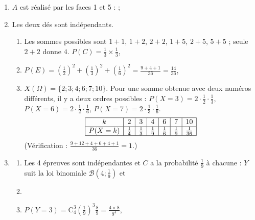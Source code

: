 \begin{enumerate}
   \item {}
      $A$ est r\'ealis\'e par les faces 1 et 5 :  ; 
   \item Les deux d\'es sont ind\'ependants.
      \begin{enumerate}
         \item {}
            Les sommes possibles sont $1+1$, $1+2$, $2+2$, $1+5$, $2+5$, $5+5$ ; seule $2 + 2$ donne $4$.
            $P(C) = \frac{1}{3}\times\frac{1}{3}$, 
         \item {}
            $P(E) = \left(\frac{1}{2}\right)^2 + \left(\frac{1}{3}\right)^2 + \left(\frac{1}{6}\right)^2 = \frac{9 + 4 + 1}{36} = \frac{14}{36}$,
            \par\noindent{}
         \item {}
            $X(\Omega) = \{2 ; 3 ; 4 ; 6 ; 7 ; 10\}$. Pour une somme obtenue avec deux num\'eros diff\'erents, il y a deux ordres possibles :
            $P(X = 3) = 2\cdot\frac{1}{2}\cdot\frac{1}{3}$, $P(X = 6) = 2\cdot\frac{1}{2}\cdot\frac{1}{6}$, $P(X = 7) = 2\cdot\frac{1}{3}\cdot\frac{1}{6}$.
            \[
               \begin{array}{|c|c|c|c|c|c|c|}
                  \hline
                  k & 2 & 3 & 4 & 6 & 7 & 10 \\ \hline
                  P(X = k) & \frac{1}{4} & \frac{1}{3} & \frac{1}{9} & \frac{1}{6} & \frac{1}{9} & \frac{1}{36} \\ \hline
               \end{array}
            \]
            (V\'erification : $\frac{9 + 12 + 4 + 6 + 4 + 1}{36} = 1$.)
      \end{enumerate}
   \item
      \begin{enumerate}
         \item {}
            Les 4 \'epreuves sont ind\'ependantes et $C$ a la probabilit\'e $\frac{1}{9}$ \`a chacune :
            $Y$ suit la loi binomiale $\mathscr{B}\left(4 ; \frac{1}{9}\right)$ et 
         \item {}
            \par\noindent{}
         \item {}
            $P(Y = 3) = \mathrm{C}_4^3 \left(\frac{1}{9}\right)^3 \frac{8}{9} = \frac{4 \times 8}{9^4}$, 
      \end{enumerate}
\end{enumerate}
